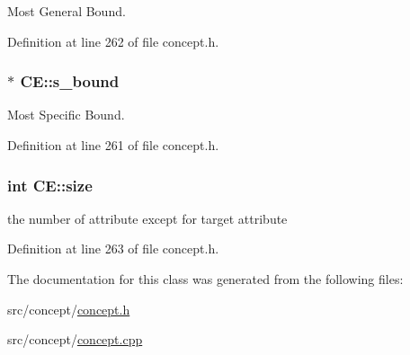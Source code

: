 Most General Bound. 



Definition at line 262 of file concept.\-h.

\hypertarget{class_c_e_a9a2c44f7213356ff82f0ef3dbcf2e3cc}{
\subsubsection[{s\-\_\-bound}]{$\ast$ C\-E\-::s\-\_\-bound\hspace{0.3cm}{\ttfamily [private]}}}\label{class_c_e_a9a2c44f7213356ff82f0ef3dbcf2e3cc}


Most Specific Bound. 



Definition at line 261 of file concept.\-h.

\hypertarget{class_c_e_a379f23d0ec5cc0448ad7c1428403e005}{
\subsubsection[{size}]{\setlength{\rightskip}{0pt plus 5cm}int C\-E\-::size\hspace{0.3cm}{\ttfamily [private]}}}\label{class_c_e_a379f23d0ec5cc0448ad7c1428403e005}


the number of attribute except for target attribute 



Definition at line 263 of file concept.\-h.



The documentation for this class was generated from the following files\-:\begin{DoxyCompactItemize}
\item 
src/concept/\hyperlink{concept_8h}{concept.\-h}\item 
src/concept/\hyperlink{concept_8cpp}{concept.\-cpp}\end{DoxyCompactItemize}
